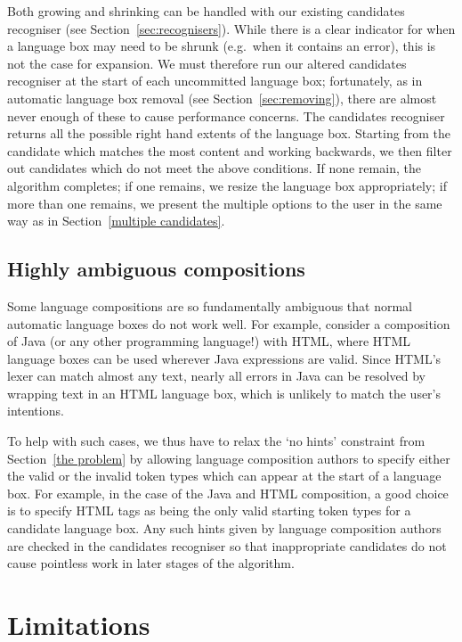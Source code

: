 \documentclass[sigplan,screen]{acmart}\settopmatter{printfolios=true,printccs=false,printacmref=false}
\begin{document}
Both growing and shrinking can be handled with our existing
candidates recogniser (see Section~\ref{sec:recognisers}).
While there is a clear indicator for when a language box may need to be shrunk
(e.g.~when it contains an error), this is not the case for expansion. We
must therefore run our altered candidates recogniser at the start of
each uncommitted language box; fortunately, as in automatic language box
removal (see Section~\ref{sec:removing}), there are almost never enough of
these to cause performance concerns. The candidates recogniser
returns all the possible right hand extents of the language box. Starting
from the candidate which matches the most content and working backwards, we then
filter out candidates which do not meet the above conditions. If none remain,
the algorithm completes; if one remains,
we resize the language box appropriately; if more than one remains, we present
the multiple options to the user in the same way as in Section~\ref{multiple candidates}.


\subsection{Highly ambiguous compositions}
\label{sec:highly ambiguous compositions}

Some language compositions are so fundamentally ambiguous that normal automatic
language boxes do not work well. For example, consider a composition of Java
(or any other programming language!) with HTML, where HTML language boxes can
be used wherever Java expressions are valid. Since HTML's lexer can match
almost any text, nearly all errors in Java can be resolved by wrapping text in
an HTML language box, which is unlikely to match the user's intentions.

To help with such cases, we thus have to relax the `no hints' constraint from
Section~\ref{the problem} by allowing language composition authors to specify
either the valid or the invalid token types which can appear at the start of
a language box. For example, in the case of the Java and HTML composition, a
good choice is to specify HTML tags as being the only valid starting token
types for a candidate language box. Any such hints given by language composition authors
are checked in the candidates recogniser so that inappropriate candidates do
not cause pointless work in later stages of the algorithm.


\section{Limitations}
\label{sec:lbox_limitations}
\end{document}
